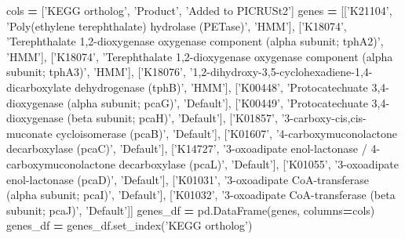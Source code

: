 \documentclass[
]{article}
\newenvironment{Shaded}{\begin{snugshade}}{\end{snugshade}}
\newcommand{\KeywordTok}[1]{\textcolor[rgb]{0.13,0.29,0.53}{\textbf{#1}}}
\newcommand{\NormalTok}[1]{#1}
\newcommand{\OperatorTok}[1]{\textcolor[rgb]{0.81,0.36,0.00}{\textbf{#1}}}
\newcommand{\StringTok}[1]{\textcolor[rgb]{0.31,0.60,0.02}{#1}}
\begin{document}
\begin{Shaded}
\begin{Highlighting}[]
\NormalTok{cols }\OperatorTok{=}\NormalTok{ [}\StringTok{'KEGG ortholog'}\NormalTok{, }\StringTok{'Product'}\NormalTok{, }\StringTok{'Added to PICRUSt2'}\NormalTok{]}
\NormalTok{genes }\OperatorTok{=}\NormalTok{ [[}\StringTok{'K21104'}\NormalTok{, }\StringTok{'Poly(ethylene terephthalate) hydrolase (PETase)'}\NormalTok{, }\StringTok{'HMM'}\NormalTok{], [}\StringTok{'K18074'}\NormalTok{, }\StringTok{'Terephthalate 1,2-dioxygenase oxygenase component (alpha subunit; tphA2)'}\NormalTok{, }\StringTok{'HMM'}\NormalTok{], [}\StringTok{'K18074'}\NormalTok{, }\StringTok{'Terephthalate 1,2-dioxygenase oxygenase component (alpha subunit; tphA3)'}\NormalTok{, }\StringTok{'HMM'}\NormalTok{], [}\StringTok{'K18076'}\NormalTok{, }\StringTok{'1,2-dihydroxy-3,5-cyclohexadiene-1,4-dicarboxylate dehydrogenase (tphB)'}\NormalTok{, }\StringTok{'HMM'}\NormalTok{], [}\StringTok{'K00448'}\NormalTok{, }\StringTok{'Protocatechuate 3,4-dioxygenase (alpha subunit; pcaG)'}\NormalTok{, }\StringTok{'Default'}\NormalTok{], [}\StringTok{'K00449'}\NormalTok{, }\StringTok{'Protocatechuate 3,4- dioxygenase (beta subunit; pcaH)'}\NormalTok{, }\StringTok{'Default'}\NormalTok{], [}\StringTok{'K01857'}\NormalTok{, }\StringTok{'3-carboxy-cis,cis-muconate cycloisomerase (pcaB)'}\NormalTok{, }\StringTok{'Default'}\NormalTok{], [}\StringTok{'K01607'}\NormalTok{, }\StringTok{'4-carboxymuconolactone decarboxylase (pcaC)'}\NormalTok{, }\StringTok{'Default'}\NormalTok{], [}\StringTok{'K14727'}\NormalTok{, }\StringTok{'3-oxoadipate enol-lactonase / 4-carboxymuconolactone decarboxylase (pcaL)'}\NormalTok{, }\StringTok{'Default'}\NormalTok{], [}\StringTok{'K01055'}\NormalTok{, }\StringTok{'3-oxoadipate enol-lactonase (pcaD)'}\NormalTok{, }\StringTok{'Default'}\NormalTok{], [}\StringTok{'K01031'}\NormalTok{, }\StringTok{'3-oxoadipate CoA-transferase (alpha subunit; pcaI)'}\NormalTok{, }\StringTok{'Default'}\NormalTok{], [}\StringTok{'K01032'}\NormalTok{, }\StringTok{'3-oxoadipate CoA-transferase (beta subunit; pcaJ)'}\NormalTok{, }\StringTok{'Default'}\NormalTok{]]}
\NormalTok{genes_df }\OperatorTok{=}\NormalTok{ pd.DataFrame(genes, columns}\OperatorTok{=}\NormalTok{cols)}
\NormalTok{genes_df }\OperatorTok{=}\NormalTok{ genes_df.set_index(}\StringTok{'KEGG ortholog'}\NormalTok{)}
\end{Highlighting}
\end{Shaded}

\begin{Shaded}
\end{Shaded}
\end{document}

